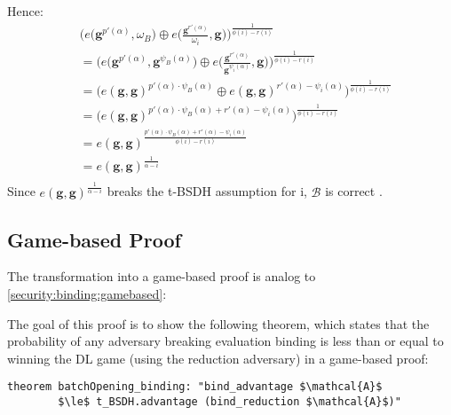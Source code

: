 Hence: 
\begin{equation*}
    \begin{aligned}
        &\biggl(e\biggl(\mathbf{g}^{p'(\alpha)}, \omega_B\biggr) \oplus e\biggl(\frac{\mathbf{g}^{r'(\alpha)}}{\omega_i}, \mathbf{g}\biggr)\biggr)^{\frac{1}{\phi(i)-r(i)}} \\
        &= \biggl(e\biggl(\mathbf{g}^{p'(\alpha)}, \mathbf{g}^{\psi_B(\alpha)}\biggr) \oplus e\biggl(\frac{\mathbf{g}^{r'(\alpha)}}{\mathbf{g}^{\psi_i(\alpha)}}, \mathbf{g}\biggr)\biggr)^{\frac{1}{\phi(i)-r(i)}} \\
        &= \biggl(e(\mathbf{g}, \mathbf{g})^{p'(\alpha) \cdot \psi_B(\alpha)} \oplus e(\mathbf{g}, \mathbf{g})^{r'(\alpha) - \psi_i(\alpha)}\biggr)^{\frac{1}{\phi(i)-r(i)}}\\
        &= \biggl(e(\mathbf{g}, \mathbf{g})^{p'(\alpha) \cdot \psi_B(\alpha) + r'(\alpha) - \psi_i(\alpha)} \biggr)^{\frac{1}{\phi(i)-r(i)}}\\
        &= e(\mathbf{g}, \mathbf{g})^{\frac{p'(\alpha) \cdot \psi_B(\alpha) + r'(\alpha) - \psi_i(\alpha)}{\phi(i)-r(i)}}\\
        &= e(\mathbf{g}, \mathbf{g})^{\frac{1}{\alpha-i}}\\
    \end{aligned}
\end{equation*}
Since $e(\mathbf{g},\mathbf{g})^{\frac{1}{\alpha-i}}$ breaks the t-BSDH assumption for i, $\mathcal{B}$ is correct \parencite*{KZG}.

\subsection*{Game-based Proof}
The transformation into a game-based proof is analog to \ref{security:binding:gamebased}: 

The goal of this proof is to show the following theorem, which states that the probability of any adversary breaking evaluation binding is less than or equal to winning the DL game (using the reduction adversary) in a game-based proof:
\begin{lstlisting}[language=isabelle]
    theorem batchOpening_binding: "bind_advantage $\mathcal{A}$ 
        $\le$ t_BSDH.advantage (bind_reduction $\mathcal{A}$)"
\end{lstlisting}

